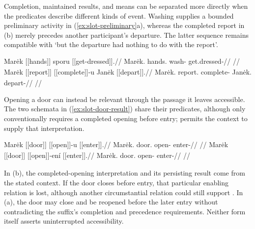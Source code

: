 Completion, maintained results, and means can be separated more directly
when the predicates describe different kinds of event. Washing supplies a
bounded preliminary activity in (\ref{ex:slot-preliminary}a), whereas the
completed report in (b) merely precedes another participant's departure.
The latter sequence remains compatible with `but the departure had nothing
to do with the report'.

\pex\label{ex:slot-preliminary}
\a
\begingl
\gla Marėk \textnormal{[[hands]]}\textsubscript{\Ind{}} sporu \textnormal{[[get-dressed]]}\textsubscript{\Pf{}}.//
\glb Marėk.\Dir{} hands.\Ind{} wash-\Seq{} get.dressed-\Pf{}//
\glft {}
//
\endgl
\a
\begingl
\gla Marėk \textnormal{[[report]]}\textsubscript{\Ind{}} [[complete]]-u Janėk \textnormal{[[depart]]}\textsubscript{\Pf{}}.//
\glb Marėk.\Dir{} report.\Ind{} complete-\Seq{} Janėk.\Dir{} depart-\Pf{}//
\glft {}
//
\endgl
\xe

Opening a door can instead be relevant through the passage it leaves
accessible. The two schemata in (\ref{ex:slot-door-result}) share their
predicates, although only  conventionally requires a completed opening
before entry;  permits the context to supply that interpretation.

\pex\label{ex:slot-door-result}
\a
\begingl
\gla Marėk \textnormal{[[door]]}\textsubscript{\Ind{}} [[open]]-u \textnormal{[[enter]]}\textsubscript{\Pf{}}.//
\glb Marėk.\Dir{} door.\Ind{} open-\Seq{} enter-\Pf{}//
\glft {}
//
\endgl
\a
\begingl
\gla Marėk \textnormal{[[door]]}\textsubscript{\Ind{}} [[open]]-ení \textnormal{[[enter]]}\textsubscript{\Pf{}}.//
\glb Marėk.\Dir{} door.\Ind{} open-\Circ{} enter-\Pf{}//
\glft {}
//
\endgl
\xe

In (b), the completed-opening interpretation and its persisting result
come from the stated context. If the door closes before entry, that particular
enabling relation is lost, although another circumstantial relation could
still support . In (a), the door may close and be reopened before
the later entry without contradicting the suffix's completion and precedence
requirements. Neither form itself asserts uninterrupted accessibility.

